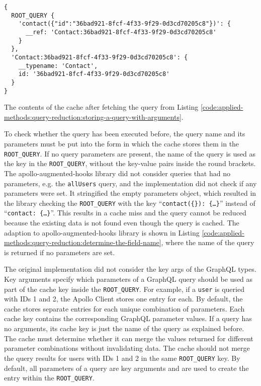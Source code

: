 \ifshowListings
\begin{listing}[H]
\begin{verbatim}
{
  ROOT_QUERY {
    'contact({"id":"36bad921-8fcf-4f33-9f29-0d3cd70205c8"})': {
      __ref: 'Contact:36bad921-8fcf-4f33-9f29-0d3cd70205c8'
    }
  },
  'Contact:36bad921-8fcf-4f33-9f29-0d3cd70205c8': {
    __typename: 'Contact',
    id: '36bad921-8fcf-4f33-9f29-0d3cd70205c8'
  }
}
\end{verbatim}
\caption{The contents of the cache after fetching the query from Listing \ref{code:applied-methods:query-reduction:storing-a-query-with-arguments}.}\label{code:applied-methods:query-reduction:cache-representation-of-query-with-arguments}
\end{listing}
\fi

\noindent To check whether the query has been executed before, the query name and its parameters must be put into the form in which the cache stores them in the \texttt{ROOT\_QUERY}. If no query parameters are present, the name of the query is used as the key in the \texttt{ROOT\_QUERY}, without the key-value pairs inside the round brackets. The apollo-augmented-hooks library did not consider queries that had no parameters, e.g. the \texttt{allUsers} query, and the implementation did not check if any parameters were set. It stringified the empty parameters object, which resulted in the library checking the \texttt{ROOT\_QUERY} with the key \enquote{\texttt{contact(\{\}): \{\dots\}}} instead of \enquote{\texttt{contact: \{\dots\}}}. This results in a cache miss and the query cannot be reduced because the existing data is not found even though the query is cached. The adaption to apollo-augmented-hooks library is shown in Listing \ref{code:applied-methods:query-reduction:determine-the-field-name}, where the name of the query is returned if no parameters are set.

\bigskip

\noindent The original implementation did not consider the key args of the GraphQL types. Key arguments specify which parameters of a GraphQL query should be used as part of the cache key inside the \texttt{ROOT\_QUERY}. For example, if a \texttt{user} is queried with \acp{ID} 1 and 2, the Apollo Client stores one entry for each. By default, the cache stores separate entries for each unique combination of parameters. Each cache key contains the corresponding GraphQL parameter values. If a query has no arguments, its cache key is just the name of the query as explained before. The cache must determine whether it can merge the values returned for different parameter combinations without invalidating data. The cache should not merge the query results for users with \acp{ID} 1 and 2 in the same \texttt{ROOT\_QUERY} key. By default, all parameters of a query are key arguments and are used to create the entry within the \texttt{ROOT\_QUERY}.  \cite{misc:-:applied-methods:query-reduction:key-args}

